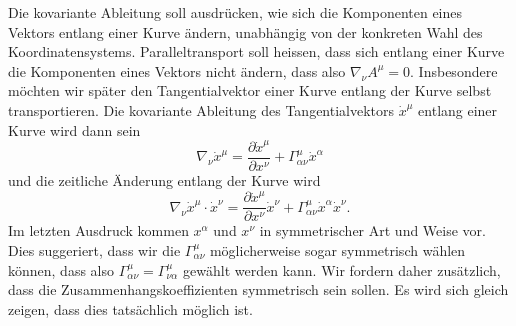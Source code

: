 Die kovariante Ableitung soll ausdrücken, wie sich die Komponenten eines
Vektors entlang einer Kurve ändern, unabhängig von der konkreten Wahl
des Koordinatensystems.
Paralleltransport soll heissen, dass sich entlang einer Kurve die
Komponenten eines Vektors nicht ändern,
dass also $\nabla_\nu A^\mu=0$.
Insbesondere möchten wir später den Tangentialvektor einer Kurve entlang
der Kurve selbst transportieren.
Die kovariante Ableitung des Tangentialvektors $\dot x^\mu$ entlang
einer Kurve wird dann sein
\[
\nabla_\nu\dot x^\mu
=
\frac{\partial \dot x^\mu}{\partial x^\nu}
+
\Gamma^\mu_{\alpha\nu}\dot x^\alpha
\]
und die zeitliche Änderung entlang der Kurve wird
\[
\nabla_\nu\dot x^\mu\cdot \dot x^\nu
=
\frac{\partial \dot x^\mu}{\partial x^\nu}\dot x^\nu
+
\Gamma^\mu_{\alpha\nu}\dot x^\alpha \dot x^\nu.
\]
Im letzten Ausdruck kommen $x^\alpha$ und $x^\nu$ in symmetrischer
Art und Weise vor.
Dies suggeriert, dass wir die $\Gamma^\mu_{\alpha\nu}$ möglicherweise
sogar symmetrisch wählen können, dass also
$\Gamma^\mu_{\alpha\nu}=\Gamma^\mu_{\nu\alpha}$
gewählt werden kann.
Wir fordern daher zusätzlich, dass die Zusammenhangskoeffizienten
symmetrisch sein sollen.
Es wird sich gleich zeigen, dass dies tatsächlich möglich ist.

